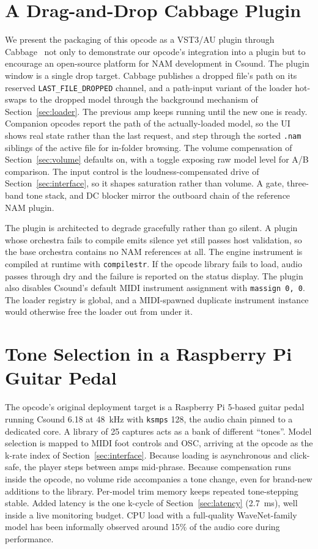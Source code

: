 \documentclass[sigconf,anonymous,review]{nimeart}
\begin{document}
\section{A Drag-and-Drop Cabbage Plugin}
\label{sec:plugin}

We present the packaging of this opcode as a VST3/AU plugin through
Cabbage~\cite{walsh2011cabbage} not only to demonstrate our opcode's
integration into a plugin but to encourage an open-source platform for NAM
development in Csound. The plugin window is a single drop target. Cabbage
publishes a dropped file's path on its reserved
\texttt{LAST\_FILE\_DROPPED} channel, and a path-input variant of the
loader hot-swaps to the dropped model through the background mechanism of
Section~\ref{sec:loader}. The previous amp keeps running until the new one
is ready. Companion opcodes report the path of the actually-loaded model,
so the UI shows real state rather than the last request, and step through
the sorted \texttt{.nam} siblings of the active file for in-folder
browsing. The volume compensation of Section~\ref{sec:volume} defaults on,
with a toggle exposing raw model level for A/B comparison. The input
control is the loudness-compensated drive of Section~\ref{sec:interface},
so it shapes saturation rather than volume. A gate, three-band tone stack,
and DC blocker mirror the outboard chain of the reference NAM plugin.

The plugin is architected to degrade gracefully rather than go silent. A
plugin whose orchestra fails to compile emits silence yet still passes
host validation, so the base orchestra contains no NAM references at all.
The engine instrument is compiled at runtime with \texttt{compilestr}. If
the opcode library fails to load, audio passes through dry and the failure
is reported on the status display. The plugin also disables Csound's
default MIDI instrument assignment with \texttt{massign 0, 0}. The loader
registry is global, and a MIDI-spawned duplicate instrument instance would
otherwise free the loader out from under it.

\section{Tone Selection in a Raspberry Pi Guitar Pedal}
\label{sec:pedal}

The opcode's original deployment target is a Raspberry Pi 5-based guitar
pedal running Csound 6.18 at 48~kHz with \texttt{ksmps} 128, the audio
chain pinned to a dedicated core. A library of 25 captures acts as a bank
of different ``tones''. Model selection is mapped to MIDI foot controls
and OSC, arriving at the opcode as the k-rate index of
Section~\ref{sec:interface}. Because loading is asynchronous and
click-safe, the player steps between amps mid-phrase. Because compensation
runs inside the opcode, no volume ride accompanies a tone change, even for
brand-new additions to the library. Per-model trim memory keeps repeated
tone-stepping stable. Added latency is the one k-cycle of
Section~\ref{sec:latency} (2.7~ms), well inside a live monitoring budget.
CPU load with a full-quality WaveNet-family model has been informally
observed around 15\% of the audio core during performance.
\end{document}
